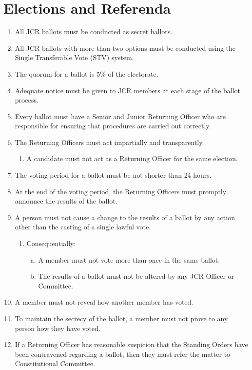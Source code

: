 \documentclass[12pt]{article}  %
\begin{document}
\section{Elections and Referenda}
\begin{enumerate}
    \item All JCR ballots must be conducted as secret ballots.
    \item All JCR ballots with more than two options must be conducted using the Single Transferable Vote (STV) system.
    \item The quorum for a ballot is 5\% of the electorate.
    \item Adequate notice must be given to JCR members at each stage of the ballot process.
    \item Every ballot must have a Senior and Junior Returning Officer who are responsible for ensuring that procedures are carried out correctly.
    \item The Returning Officers must act impartially and transparently.
    \begin{enumerate}
        \item A candidate must not act as a Returning Officer for the same election.
    \end{enumerate}
    \item The voting period for a ballot must be not shorter than 24 hours.
    \item At the end of the voting period, the Returning Officers must promptly announce the results of the ballot.
    \item A person must not cause a change to the results of a ballot by any action other than the casting of a single lawful vote.
    \begin{enumerate}
        \item Consequentially:
        \begin{enumerate}[(a)]
            \item A member must not vote more than once in the same ballot.
            \item The results of a ballot must not be altered by any JCR Officer or Committee.
        \end{enumerate}
    \end{enumerate}
    \item A member must not reveal how another member has voted.
    \item To maintain the secrecy of the ballot, a member must not prove to any person how they have voted.
    \item If a Returning Officer has reasonable suspicion that the Standing Orders have been contravened regarding a ballot, then they must refer the matter to Constitutional Committee.

\end{enumerate}
\end{document}
